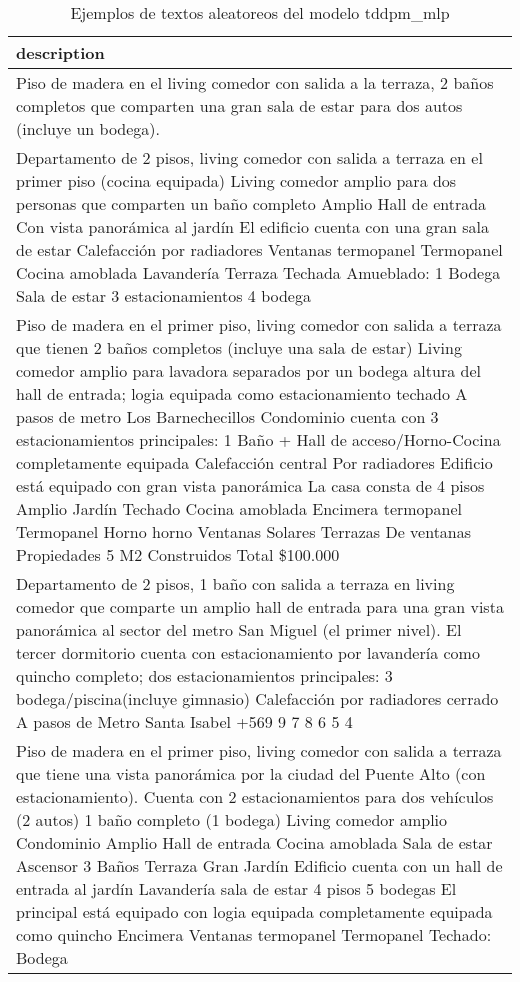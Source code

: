 \begin{table}[H]
\centering
\fontsize{8}{14}\selectfont
\caption{Ejemplos de textos aleatoreos del modelo tddpm\_mlp}
\label{table-sample10-economicos-a-1-tddpm_mlp-text}
\begin{tabular}{|m{45em}|}
\hline
\rowcolor[gray]{0.8}
description \\
\hline Piso de madera en el living comedor con salida a la terraza, 2 baños completos que comparten una gran sala de estar para dos autos (incluye un bodega). \\
\hline Departamento de 2 pisos, living comedor con salida a terraza en el primer piso (cocina equipada) Living comedor amplio para dos personas que comparten un baño completo Amplio Hall de entrada Con vista panorámica al jardín El edificio cuenta con una gran sala de estar Calefacción por radiadores Ventanas termopanel Termopanel Cocina amoblada Lavandería Terraza Techada Amueblado: 1 Bodega Sala de estar 3 estacionamientos 4 bodega \\
\hline Piso de madera en el primer piso, living comedor con salida a terraza que tienen 2 baños completos (incluye una sala de estar) Living comedor amplio para lavadora separados por un bodega altura del hall de entrada; logia equipada como estacionamiento techado A pasos de metro Los Barnechecillos Condominio cuenta con 3 estacionamientos principales: 1 Baño + Hall de acceso/Horno-Cocina completamente equipada Calefacción central Por radiadores Edificio está equipado con gran vista panorámica La casa consta de 4 pisos Amplio Jardín Techado Cocina amoblada Encimera termopanel Termopanel Horno horno Ventanas Solares Terrazas De ventanas Propiedades 5 M2 Construidos Total \$100.000 \\
\hline Departamento de 2 pisos, 1 baño con salida a terraza en living comedor que comparte un amplio hall de entrada para una gran vista panorámica al sector del metro San Miguel (el primer nivel). El tercer dormitorio cuenta con estacionamiento por lavandería como quincho completo; dos estacionamientos principales: 3 bodega/piscina(incluye gimnasio) Calefacción por radiadores cerrado A pasos de Metro Santa Isabel +569 9 7 8 6 5 4 \\
\hline Piso de madera en el primer piso, living comedor con salida a terraza que tiene una vista panorámica por la ciudad del Puente Alto (con estacionamiento). Cuenta con 2 estacionamientos para dos vehículos (2 autos) 1 baño completo (1 bodega) Living comedor amplio Condominio Amplio Hall de entrada Cocina amoblada Sala de estar Ascensor 3 Baños Terraza Gran Jardín Edificio cuenta con un hall de entrada al jardín Lavandería sala de estar 4 pisos 5 bodegas El principal está equipado con logia equipada completamente equipada como quincho Encimera Ventanas termopanel Termopanel Techado: Bodega \\

\end{tabular}
\end{table}
